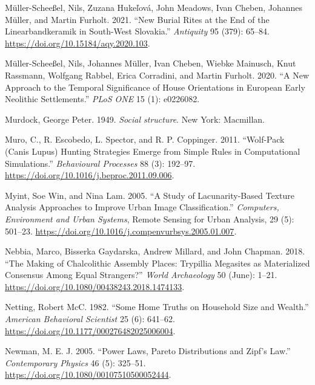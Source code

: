 \documentclass[
  12pt,
  a4paper, twoside]{book}
\newlength{\cslhangindent}
\newlength{\cslentryspacingunit} %
\newenvironment{CSLReferences}[2] %
 {%
  \setlength{\parindent}{0pt}
  \ifodd #1
  \let\oldpar\par
  \def\par{\hangindent=\cslhangindent\oldpar}
  \fi
  \setlength{\parskip}{#2\cslentryspacingunit}
 }%
 {}
\begin{document}
\begin{CSLReferences}{1}{0}
\leavevmode{}%
Müller-Scheeßel, Nils, Zuzana Hukeľová, John Meadows, Ivan Cheben, Johannes Müller, and Martin Furholt. 2021. {``New Burial Rites at the End of the {Linearbandkeramik} in South-West {Slovakia}.''} \emph{Antiquity} 95 (379): 65--84. \url{https://doi.org/10.15184/aqy.2020.103}.

\leavevmode{}%
Müller-Scheeßel, Nils, Johannes Müller, Ivan Cheben, Wiebke Mainusch, Knut Rassmann, Wolfgang Rabbel, Erica Corradini, and Martin Furholt. 2020. {``A New Approach to the Temporal Significance of House Orientations in European Early Neolithic Settlements.''} \emph{PLoS ONE} 15 (1): e0226082.

\leavevmode{}%
Murdock, George Peter. 1949. \emph{Social structure}. New York: Macmillan.

\leavevmode{}%
Muro, C., R. Escobedo, L. Spector, and R. P. Coppinger. 2011. {``Wolf-Pack (Canis Lupus) Hunting Strategies Emerge from Simple Rules in Computational Simulations.''} \emph{Behavioural Processes} 88 (3): 192--97. \url{https://doi.org/10.1016/j.beproc.2011.09.006}.

\leavevmode{}%
Myint, Soe Win, and Nina Lam. 2005. {``A Study of Lacunarity-Based Texture Analysis Approaches to Improve Urban Image Classification.''} \emph{Computers, Environment and Urban Systems}, Remote Sensing for Urban Analysis, 29 (5): 501--23. \url{https://doi.org/10.1016/j.compenvurbsys.2005.01.007}.

\leavevmode{}%
Nebbia, Marco, Bisserka Gaydarska, Andrew Millard, and John Chapman. 2018. {``The Making of Chalcolithic Assembly Places: Trypillia Megasites as Materialized Consensus Among Equal Strangers?''} \emph{World Archaeology} 50 (June): 1--21. \url{https://doi.org/10.1080/00438243.2018.1474133}.

\leavevmode{}%
Netting, Robert McC. 1982. {``Some Home Truths on Household Size and Wealth.''} \emph{American Behavioral Scientist} 25 (6): 641--62. \url{https://doi.org/10.1177/000276482025006004}.

\leavevmode{}%
Newman, M. E. J. 2005. {``Power Laws, Pareto Distributions and Zipf's Law.''} \emph{Contemporary Physics} 46 (5): 325--51. \url{https://doi.org/10.1080/00107510500052444}.


\end{CSLReferences}
\end{document}
